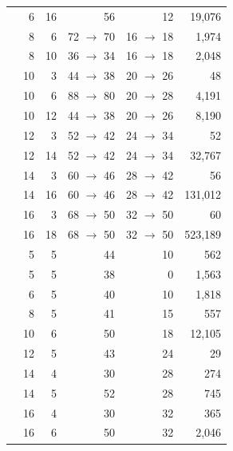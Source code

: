 \begin{longtable}{@{}L{4.4cm} r r r r r@{}}
 & 6 & 16 & 56 & 12 & 19,076 \\
 & 8 & 6 & 72 $\to$ 70 & 16 $\to$ 18 & 1,974 \\
 & 8 & 10 & 36 $\to$ 34 & 16 $\to$ 18 & 2,048 \\
 & 10 & 3 & 44 $\to$ 38 & 20 $\to$ 26 & 48 \\
 & 10 & 6 & 88 $\to$ 80 & 20 $\to$ 28 & 4,191 \\
 & 10 & 12 & 44 $\to$ 38 & 20 $\to$ 26 & 8,190 \\
 & 12 & 3 & 52 $\to$ 42 & 24 $\to$ 34 & 52 \\
 & 12 & 14 & 52 $\to$ 42 & 24 $\to$ 34 & 32,767 \\
 & 14 & 3 & 60 $\to$ 46 & 28 $\to$ 42 & 56 \\
 & 14 & 16 & 60 $\to$ 46 & 28 $\to$ 42 & 131,012 \\
 & 16 & 3 & 68 $\to$ 50 & 32 $\to$ 50 & 60 \\
 & 16 & 18 & 68 $\to$ 50 & 32 $\to$ 50 & 523,189 \\
 & 5 & 5 & 44 & 10 & 562 \\
 & 5 & 5 & 38 & 0 & 1,563 \\
 & 6 & 5 & 40 & 10 & 1,818 \\
 & 8 & 5 & 41 & 15 & 557 \\
 & 10 & 6 & 50 & 18 & 12,105 \\
 & 12 & 5 & 43 & 24 & 29 \\
 & 14 & 4 & 30 & 28 & 274 \\
 & 14 & 5 & 52 & 28 & 745 \\
 & 16 & 4 & 30 & 32 & 365 \\
 & 16 & 6 & 50 & 32 & 2,046 \\
\bottomrule
\end{longtable}
